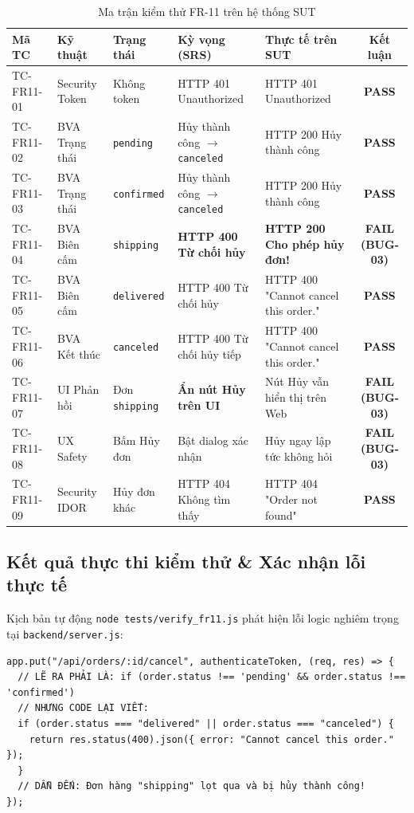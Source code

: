 \documentclass[11pt,a4paper]{article}
\begin{document}
\begin{table}[h]
\centering
\footnotesize
\begin{tabularx}{\textwidth}{l L{2.2cm} L{1.8cm} L{3cm} Y c}
\toprule
\textbf{Mã TC} & \textbf{Kỹ thuật} & \textbf{Trạng thái} & \textbf{Kỳ vọng (SRS)} & \textbf{Thực tế trên SUT} & \textbf{Kết luận} \\
\midrule
TC-FR11-01 & Security Token & Không token & HTTP 401 Unauthorized & HTTP 401 Unauthorized & \textbf{PASS} \\
TC-FR11-02 & BVA Trạng thái & \texttt{pending} & Hủy thành công $\to$ \texttt{canceled} & HTTP 200 Hủy thành công & \textbf{PASS} \\
TC-FR11-03 & BVA Trạng thái & \texttt{confirmed} & Hủy thành công $\to$ \texttt{canceled} & HTTP 200 Hủy thành công & \textbf{PASS} \\
TC-FR11-04 & BVA Biên cấm & \texttt{shipping} & \textbf{HTTP 400 Từ chối hủy} & \textbf{HTTP 200 Cho phép hủy đơn!} & \textbf{\color{darkred}FAIL (BUG-03)} \\
TC-FR11-05 & BVA Biên cấm & \texttt{delivered} & HTTP 400 Từ chối hủy & HTTP 400 "Cannot cancel this order." & \textbf{PASS} \\
TC-FR11-06 & BVA Kết thúc & \texttt{canceled} & HTTP 400 Từ chối hủy tiếp & HTTP 400 "Cannot cancel this order." & \textbf{PASS} \\
TC-FR11-07 & UI Phản hồi & Đơn \texttt{shipping} & \textbf{Ẩn nút Hủy trên UI} & Nút Hủy vẫn hiển thị trên Web & \textbf{\color{darkred}FAIL (BUG-03)} \\
TC-FR11-08 & UX Safety & Bấm Hủy đơn & Bật dialog xác nhận & Hủy ngay lập tức không hỏi & \textbf{\color{darkred}FAIL (BUG-03)} \\
TC-FR11-09 & Security IDOR & Hủy đơn khác & HTTP 404 Không tìm thấy & HTTP 404 "Order not found" & \textbf{PASS} \\
\bottomrule
\end{tabularx}
\caption{Ma trận kiểm thử FR-11 trên hệ thống SUT}
\end{table}

\subsection{Kết quả thực thi kiểm thử \& Xác nhận lỗi thực tế}
Kịch bản tự động \texttt{node tests/verify\_fr11.js} phát hiện lỗi logic nghiêm trọng tại \texttt{backend/server.js}:
\begin{lstlisting}[caption={Lỗi logic backend kiểm tra sai trạng thái hủy đơn}]
app.put("/api/orders/:id/cancel", authenticateToken, (req, res) => {
  // LẼ RA PHẢI LÀ: if (order.status !== 'pending' && order.status !== 'confirmed')
  // NHƯNG CODE LẠI VIẾT:
  if (order.status === "delivered" || order.status === "canceled") {
    return res.status(400).json({ error: "Cannot cancel this order." });
  }
  // DẪN ĐẾN: Đơn hàng "shipping" lọt qua và bị hủy thành công!
});
\end{lstlisting}
\end{document}
